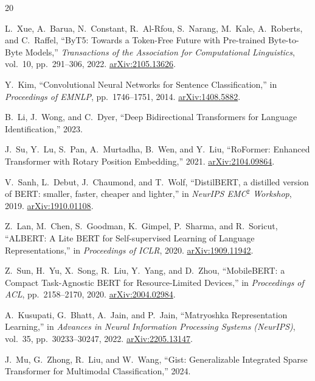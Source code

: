 \documentclass[11pt,a4paper]{article}
\begin{document}

\begin{thebibliography}{20}

L.~Xue, A.~Barua, N.~Constant, R.~Al-Rfou, S.~Narang, M.~Kale, A.~Roberts, and
C.~Raffel, ``ByT5: Towards a Token-Free Future with Pre-trained Byte-to-Byte
Models,'' \emph{Transactions of the Association for Computational Linguistics},
vol.~10, pp.~291--306, 2022. \href{https://arxiv.org/abs/2105.13626}{arXiv:2105.13626}.

Y.~Kim, ``Convolutional Neural Networks for Sentence Classification,''
in \emph{Proceedings of EMNLP}, pp.~1746--1751, 2014.
\href{https://arxiv.org/abs/1408.5882}{arXiv:1408.5882}.

B.~Li, J.~Wong, and C.~Dyer, ``Deep Bidirectional Transformers for Language
Identification,'' 2023.

J.~Su, Y.~Lu, S.~Pan, A.~Murtadha, B.~Wen, and Y.~Liu, ``RoFormer: Enhanced
Transformer with Rotary Position Embedding,'' 2021.
\href{https://arxiv.org/abs/2104.09864}{arXiv:2104.09864}.

V.~Sanh, L.~Debut, J.~Chaumond, and T.~Wolf, ``DistilBERT, a distilled version
of BERT: smaller, faster, cheaper and lighter,'' in \emph{NeurIPS EMC$^2$
Workshop}, 2019. \href{https://arxiv.org/abs/1910.01108}{arXiv:1910.01108}.

Z.~Lan, M.~Chen, S.~Goodman, K.~Gimpel, P.~Sharma, and R.~Soricut, ``ALBERT: A
Lite BERT for Self-supervised Learning of Language Representations,'' in
\emph{Proceedings of ICLR}, 2020.
\href{https://arxiv.org/abs/1909.11942}{arXiv:1909.11942}.

Z.~Sun, H.~Yu, X.~Song, R.~Liu, Y.~Yang, and D.~Zhou, ``MobileBERT: a Compact
Task-Agnostic BERT for Resource-Limited Devices,'' in \emph{Proceedings of ACL},
pp.~2158--2170, 2020. \href{https://arxiv.org/abs/2004.02984}{arXiv:2004.02984}.

A.~Kusupati, G.~Bhatt, A.~Jain, and P.~Jain, ``Matryoshka Representation
Learning,'' in \emph{Advances in Neural Information Processing Systems
(NeurIPS)}, vol.~35, pp.~30233--30247, 2022.
\href{https://arxiv.org/abs/2205.13147}{arXiv:2205.13147}.

J.~Mu, G.~Zhong, R.~Liu, and W.~Wang, ``Gist: Generalizable Integrated Sparse
Transformer for Multimodal Classification,'' 2024.


\end{thebibliography}
\end{document}
